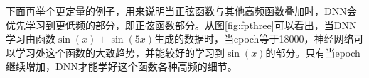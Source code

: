 下面再举个更定量的例子，用来说明当正弦函数与其他高频函数叠加时，DNN会优先学习到更低频的部分，即正弦函数部分。从图\ref{fig:fpthree}可以看出，当DNN学习由函数$\sin (x)+\sin (5x)$生成的数据时，当epoch等于18000，神经网络可以学习处这个函数的大致趋势，并能较好的学习到$\sin (x)$的部分。只有当epoch继续增加，DNN才能学好这个函数各种高频的细节。
\begin{figure}[htbp!]
    \centering

\end{figure}
